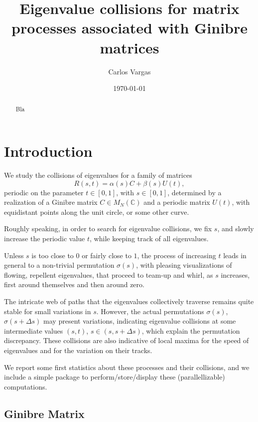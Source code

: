 \documentclass{article}
\title{Eigenvalue collisions for
matrix processes associated with Ginibre matrices}
\author{Carlos Vargas}
\date{\today}
\begin{document}
	\maketitle	
	\begin{abstract}
	Bla
 	\end{abstract} 

	\section{Introduction}
	We study the collisions of eigenvalues for a family of matrices 
	$$R(s,t) = \alpha(s)C + \beta(s)U(t),$$ 
	periodic on the parameter $t\in [0,1]$, with $s\in [0, 1]$,   
	determined by a realization of a Ginibre matrix $C \in M_N(\mathbb{C})$ 
	and a periodic matrix $U(t)$, 
	with equidistant points along the unit circle, 
	or some other curve. 
		
	Roughly speaking, in order to search for eigenvalue collisions, 
	we fix $s$, and slowly increase the periodic value $t$, 
	while keeping track of all eigenvalues.	
	
	Unless $s$ is too close to $0$ or fairly close to $1$, 
	the process of increasing $t$ leads in general to a non-trivial permutation $\sigma(s)$, 
	with pleasing visualizations of flowing, repellent eigenvalues, 
	that proceed to team-up and whirl, as $s$ increases,
	first around themselves and then around zero.
	
	The intricate web of paths that the eigenvalues collectively traverse 
	remains quite stable for small variations in $s$. 
	However, the actual permutations $\sigma(s)$, $\sigma(s + \Delta s)$ 
	may present variations, 
	indicating eigenvalue collisions 
	at some intermediate values $(s,t)$, $s\in (s, s + \Delta s)$,
	which explain the permutation discrepancy.	
	These collisions are also indicative of local maxima for the speed of eigenvalues 
	and for the variation on their tracks.

	We report some first statistics about these processes and their collisions, 
	and we include a simple package to perform/store/display these (parallellizable) 
	computations.

	\subsection{Ginibre Matrix}
\end{document}
